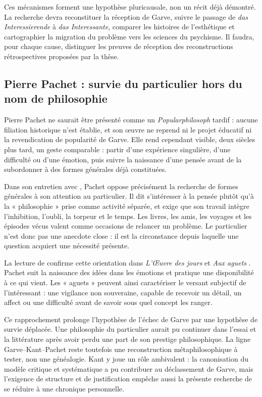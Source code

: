 \documentclass[11pt,a4paper]{article}
\begin{document}
Ces mécanismes forment une hypothèse pluricausale, non un récit déjà démontré.
La recherche devra reconstituer la réception de Garve, suivre le passage de
\emph{das Interessierende} à \emph{das Interessante}, comparer les histoires de
l'esthétique et cartographier la migration du problème vers les sciences du
psychisme. Il faudra, pour chaque cause, distinguer les preuves de réception des
reconstructions rétrospectives proposées par la thèse.

\subsection{Pierre Pachet : survie du particulier hors du nom de philosophie}

Pierre Pachet ne saurait être présenté comme un \emph{Popularphilosoph} tardif :
aucune filiation historique n'est établie, et son œuvre ne reprend ni le projet
éducatif ni la revendication de popularité de Garve. Elle rend cependant visible,
deux siècles plus tard, un geste comparable : partir d'une expérience singulière,
d'une difficulté ou d'une émotion, puis suivre la naissance d'une pensée avant de
la subordonner à des formes générales déjà constituées.

Dans son entretien avec \textcite{salgas1991pachet}, Pachet oppose précisément la
recherche de formes générales à son attention au particulier. Il dit s'intéresser
à la pensée plutôt qu'à la « philosophie » prise comme activité séparée, et exige
que son travail intègre l'inhibition, l'oubli, la torpeur et le temps. Les livres,
les amis, les voyages et les épisodes vécus valent comme occasions de relancer un
problème. Le particulier n'est donc pas une anecdote close : il est la circonstance
depuis laquelle une question acquiert une nécessité présente.

La lecture de \textcite{rueff2016promontoire} confirme cette orientation dans
\emph{L'Œuvre des jours} et \emph{Aux aguets}
\parencite{pachet1999oeuvre,pachet2002aguets}. Pachet suit la naissance des idées
dans les émotions et pratique une disponibilité à ce qui vient. Les « aguets »
peuvent ainsi caractériser le versant subjectif de l'intéressant : une vigilance
non souveraine, capable de recevoir un détail, un affect ou une difficulté avant
de savoir sous quel concept les ranger.

Ce rapprochement prolonge l'hypothèse de l'échec de Garve par une hypothèse de
survie déplacée. Une philosophie du particulier aurait pu continuer dans l'essai
et la littérature après avoir perdu une part de son prestige philosophique. La
ligne Garve--Kant--Pachet reste toutefois une reconstruction métaphilosophique à
tester, non une généalogie. Kant y joue un rôle ambivalent : la canonisation du
modèle critique et systématique a pu contribuer au déclassement de Garve, mais
l'exigence de structure et de justification empêche aussi la présente recherche
de se réduire à une chronique personnelle.
\end{document}
